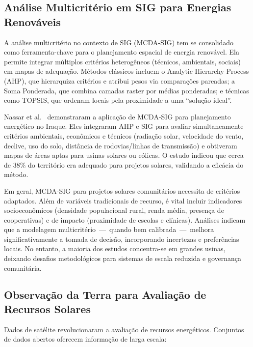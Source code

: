 \documentclass[12pt, a4paper]{article}
\begin{document}
\begin{itemize}
\subsection{Análise Multicritério em SIG para Energias Renováveis}

A análise multicritério no contexto de SIG (MCDA-SIG) tem se consolidado como ferramenta-chave para o planejamento espacial de energia renovável. Ela permite integrar múltiplos critérios heterogêneos (técnicos, ambientais, sociais) em mapas de adequação. Métodos clássicos incluem o Analytic Hierarchy Process (AHP), que hierarquiza critérios e atribui pesos via comparações pareadas; a Soma Ponderada, que combina camadas raster por médias ponderadas; e técnicas como TOPSIS, que ordenam locais pela proximidade a uma ``solução ideal''.

Nassar et al.~\citep{Nassar2025} demonstraram a aplicação de MCDA-SIG para planejamento energético no Iraque. Eles integraram AHP e SIG para avaliar simultaneamente critérios ambientais, econômicos e técnicos (radiação solar, velocidade do vento, declive, uso do solo, distância de rodovias/linhas de transmissão) e obtiveram mapas de áreas aptas para usinas solares ou eólicas. O estudo indicou que cerca de 38\% do território era adequado para projetos solares, validando a eficácia do método.

Em geral, MCDA-SIG para projetos solares comunitários necessita de critérios adaptados. Além de variáveis tradicionais de recurso, é vital incluir indicadores socioeconômicos (densidade populacional rural, renda média, presença de cooperativas) e de impacto (proximidade de escolas e clínicas). Análises indicam que a modelagem multicritério~---~quando bem calibrada~---~melhora significativamente a tomada de decisão, incorporando incertezas e preferências locais. No entanto, a maioria dos estudos concentra-se em grandes usinas, deixando desafios metodológicos para sistemas de escala reduzida e governança comunitária.

\subsection{Observação da Terra para Avaliação de Recursos Solares}

Dados de satélite revolucionaram a avaliação de recursos energéticos. Conjuntos de dados abertos oferecem informação de larga escala:


\end{itemize}
\end{document}
